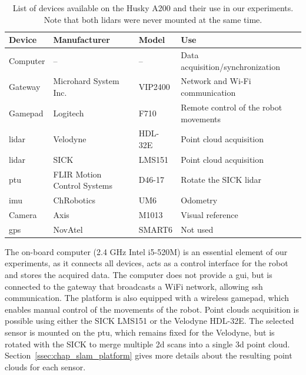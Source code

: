 \begin{table}
    \centering
    \begin{tabular}{@{}llll@{}}
        \toprule
        \textbf{Device} & \textbf{Manufacturer}       & \textbf{Model}  & \textbf{Use}                          \\ \hline
        Computer        & --                          & --              & Data acquisition/synchronization      \\
        Gateway         & Microhard System Inc.       & VIP2400         & Network and Wi-Fi communication       \\
        Gamepad         & Logitech                    & F710            & Remote control of the robot movements \\
        \gls*{lidar}    & Velodyne                    & HDL-32E         & Point cloud acquisition               \\
        \gls*{lidar}    & SICK                        & LMS151          & Point cloud acquisition               \\
        \gls*{ptu}      & FLIR Motion Control Systems & D46-17          & Rotate the SICK \gls*{lidar}          \\
        \gls*{imu}      & ChRobotics                  & UM6             & Odometry                              \\
        Camera          & Axis                        & M1013           & Visual reference                      \\
        \gls*{gps}      & NovAtel                     & SMART6          & Not used                              \\
        \bottomrule
    \end{tabular}
    \caption[List of devices available on the Husky A200 and their use in our experiments.]{List of devices available on the Husky A200 and their use in our experiments. Note that both \gls*{lidar}s were never mounted at the same time.}
    \label{tab:husky_devices}
\end{table}

The on-board computer (2.4 GHz Intel i5-520M) is an essential element of our experiments, as it connects all devices, acts as a control interface for the robot and stores the acquired data. The computer does not provide a \gls*{gui}, but is connected to the gateway that broadcasts a WiFi network, allowing \gls*{ssh} communication. The platform is also equipped with a wireless gamepad, which enables manual control of the movements of the robot. Point clouds acquisition is possible using either the SICK LMS151 or the Velodyne HDL-32E. The selected sensor is mounted on the \gls*{ptu}, which remains fixed for the Velodyne, but is rotated with the SICK to merge multiple \gls*{2d} scans into a single \gls*{3d} point cloud. Section~\ref{ssec:chap_slam_platform} gives more details about the resulting point clouds for each sensor.

